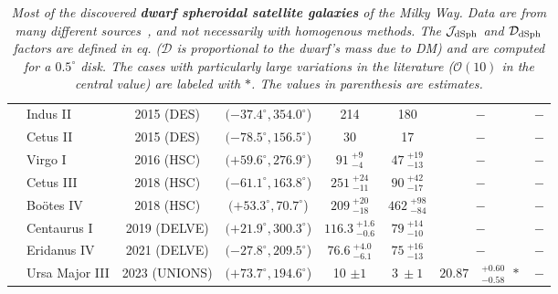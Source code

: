 \begin{table}[p]
\begin{center}
{\begin{tabular}{cl|c|c|c|c||rl|rl}
& Indus II 			& 2015 {\scriptsize (DES)} 		& $(-37.4^\circ, 354.0^\circ$) 	&  214	 	& 180			& \multicolumn{2}{c|}{$-$}			& \multicolumn{2}{c}{$-$}  \\
& Cetus II 			& 2015 {\scriptsize (DES)} 		& $(-78.5^\circ, 156.5^\circ$) 	&  30		 	& 17				& \multicolumn{2}{c|}{$-$}			& \multicolumn{2}{c}{$-$}  \\
& Virgo I			& 2016 {\scriptsize (HSC)} 		& $(+59.6^\circ, 276.9^\circ$) 	&  $91\ ^{+9}_{-4}$		& $47\ ^{+19}_{-13}$		& \multicolumn{2}{c|}{$-$}			& \multicolumn{2}{c}{$-$}  \\
& Cetus III			& 2018 {\scriptsize (HSC)} 		& $(-61.1^\circ, 163.8^\circ$) 	&  $251\ ^{+24}_{-11}$	& $90\ ^{+42}_{-17}$		& \multicolumn{2}{c|}{$-$}			& \multicolumn{2}{c}{$-$}  \\
& Bo\"otes IV		& 2018 {\scriptsize (HSC)} 		& $(+53.3^\circ, 70.7^\circ$) 	&  $209\ ^{+20}_{-18}$ 	&  $462\ ^{+98}_{-84}$	& \multicolumn{2}{c|}{$-$}			& \multicolumn{2}{c}{$-$} \\  
& Centaurus I		& 2019 {\scriptsize (DELVE)} 		& $(+21.9^\circ, 300.3^\circ$) 	&  $116.3\ ^{+1.6}_{-0.6}$ 	&  $79\ ^{+14}_{-10}$	& \multicolumn{2}{c|}{$-$}			& \multicolumn{2}{c}{$-$} \\
& Eridanus IV		& 2021 {\scriptsize (DELVE)} 		& $(-27.8^\circ, 209.5^\circ$) 	&  $76.6\ ^{+4.0}_{-6.1}$ 	&  $75\ ^{+16}_{-13}$	& \multicolumn{2}{c|}{$-$}			& \multicolumn{2}{c}{$-$} \\
& Ursa Major III		& 2023 {\scriptsize (UNIONS)} 		& $(+73.7^\circ, 194.6^\circ$) 	&  10 $\pm 1$ 			&  $3\ \pm 1$			& $20.87$&$^{+0.60}_{-0.58} \ \ \ast$& \multicolumn{2}{c}{$-$}
 \end{tabular}}
\end{center}
\vspace{-7mm}
\caption[Dwarf galaxies]{\em \footnotesize \label{tab:dwarfs} Most of the discovered {\bfseries dwarf spheroidal satellite galaxies} of the Milky Way. Data are from many different sources~\cite{dwarfgalaxies,Jdwarfs}, and not necessarily with homogenous methods. The ${\mathcal J}_{\rm dSph}$ and ${\mathcal D}_{\rm dSph}$ factors are defined in eq. (${\mathcal D}$ is proportional to the dwarf's mass due to DM) and are computed for a $0.5^\circ$ disk.  
 The cases with particularly large variations in the literature ($\mathcal{O}(10)$ in the central value) are labeled with $\ast$. The values in parenthesis are estimates.}
\end{table}


